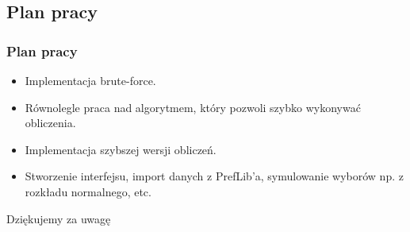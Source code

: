 \documentclass{beamer}
\begin{document}

\subsection{Plan pracy}

\begin{frame}
\frametitle{Plan pracy}
\begin{itemize}
\item Implementacja brute-force.
\item Równolegle praca nad algorytmem, który pozwoli szybko wykonywać obliczenia.
\item Implementacja szybszej wersji obliczeń.
\item Stworzenie interfejsu, import danych z PrefLib'a, symulowanie wyborów np. z rozkładu normalnego, etc.
\end{itemize}
\end{frame}



\begin{frame}
\Huge{\centerline{Dziękujemy za uwagę}}
\end{frame}

\end{document}

